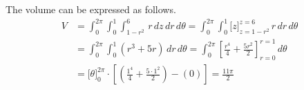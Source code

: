 \documentclass[a4paper, 12pt]{article}
\begin{document}
\begin{enumerate}[leftmargin=*,label=\textbf{\arabic*.}]
\begin{enumerate}[leftmargin=*,label=\textbf{\alph*.}]
The volume can be expressed as follows.
\begin{align*}
    V&=\int_0^{2\pi}\int_0^1\int_{1-r^2}^{6}\,r\,dz\,dr\,d\theta=\int_0^{2\pi}\int_0^1\big[z\big]_{z=1-r^2}^{z=6}\,r\,dr\,d\theta\\[1em]&=\int_0^{2\pi}\int_0^1\left(r^3+5r\right)\,dr\,d\theta=\int_0^{2\pi}\left[\frac{r^4}{4} + \frac{5r^2}{2}\right]_{r=0}^{r=1}\,d\theta\\[1em]&=\big[\theta\big]_0^{2\pi}\cdot\left[ \left(\frac{1^4}4 + \frac{5\cdot1^2}2\right)-\left(0\right)\right]=\boxed{\frac{11\pi}2}
\end{align*}

\end{enumerate}
\end{enumerate}
\end{document}
